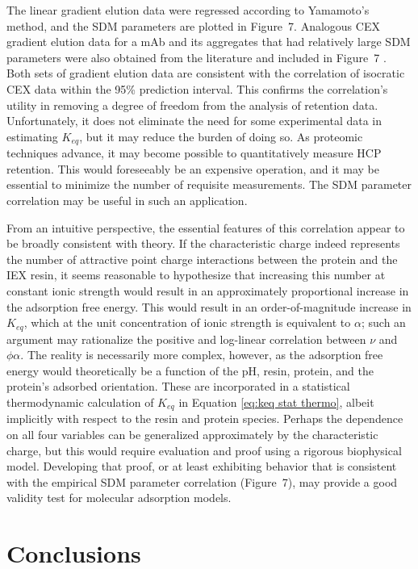 \documentclass[preprint,review,12pt]{elsarticle}
\begin{document}
        The linear gradient elution data were regressed according to Yamamoto's method, and the SDM parameters are plotted in Figure~7. Analogous CEX gradient elution data for a mAb and its aggregates that had relatively large SDM parameters were also obtained from the literature and included in Figure~7 \cite{Saleh2020}. Both sets of gradient elution data are consistent with the correlation of isocratic CEX data within the 95\% prediction interval. This confirms the correlation's utility in removing a degree of freedom from the analysis of retention data. Unfortunately, it does not eliminate the need for some experimental data in estimating $K_{eq}$, but it may reduce the burden of doing so. As proteomic techniques advance, it may become possible to quantitatively measure HCP retention. This would foreseeably be an expensive operation, and it may be essential to minimize the number of requisite measurements. The SDM parameter correlation may be useful in such an application.

        From an intuitive perspective, the essential features of this correlation appear to be broadly consistent with theory. If the characteristic charge indeed represents the number of attractive point charge interactions between the protein and the IEX resin, it seems reasonable to hypothesize that increasing this number at constant ionic strength would result in an approximately proportional increase in the adsorption free energy. This would result in an order-of-magnitude increase in $K_{eq}$, which at the unit concentration of ionic strength is equivalent to $\alpha$; such an argument may rationalize the positive and log-linear correlation between $\nu$ and $\phi \alpha$. The reality is necessarily more complex, however, as the adsorption free energy would theoretically be a function of the pH, resin, protein, and the protein's adsorbed orientation.  These are incorporated in a statistical thermodynamic calculation of $K_{eq}$ in Equation \ref{eq:keq stat thermo}, albeit implicitly with respect to the resin and protein species. Perhaps the dependence on all four variables can be generalized approximately by the characteristic charge, but this would require evaluation and proof using a rigorous biophysical model. Developing that proof, or at least exhibiting behavior that is consistent with the empirical SDM parameter correlation (Figure~7), may provide a good validity test for molecular adsorption models.

\section{Conclusions} \label{sec:concl}
\end{document}
